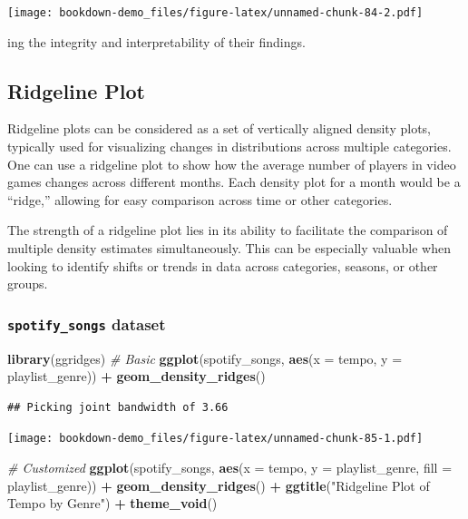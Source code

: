 \documentclass[
  b5paper]{book}
\newenvironment{Shaded}{\begin{snugshade}}{\end{snugshade}}
\newcommand{\AttributeTok}[1]{\textcolor[rgb]{0.13,0.29,0.53}{#1}}
\newcommand{\CommentTok}[1]{\textcolor[rgb]{0.56,0.35,0.01}{\textit{#1}}}
\newcommand{\FunctionTok}[1]{\textcolor[rgb]{0.13,0.29,0.53}{\textbf{#1}}}
\newcommand{\NormalTok}[1]{#1}
\newcommand{\SpecialCharTok}[1]{\textcolor[rgb]{0.81,0.36,0.00}{\textbf{#1}}}
\newcommand{\StringTok}[1]{\textcolor[rgb]{0.31,0.60,0.02}{#1}}
\begin{document}
\texttt{[image: bookdown-demo\_files/figure-latex/unnamed-chunk-84-2.pdf]}

ing the integrity and interpretability of their findings.

\hypertarget{ridgeline-plot}{%
\subsection*{Ridgeline Plot}\label{ridgeline-plot}}

Ridgeline plots can be considered as a set of vertically aligned density plots, typically used for visualizing changes in distributions across multiple categories. One can use a ridgeline plot to show how the average number of players in video games changes across different months. Each density plot for a month would be a ``ridge,'' allowing for easy comparison across time or other categories.

The strength of a ridgeline plot lies in its ability to facilitate the comparison of multiple density estimates simultaneously. This can be especially valuable when looking to identify shifts or trends in data across categories, seasons, or other groups.

\hypertarget{spotify_songs-dataset-7}{%
\subsubsection*{\texorpdfstring{\texttt{spotify\_songs} dataset}{spotify\_songs dataset}}\label{spotify_songs-dataset-7}}

\begin{Shaded}
\begin{Highlighting}[]
\FunctionTok{library}\NormalTok{(ggridges)}
\CommentTok{\# Basic}
\FunctionTok{ggplot}\NormalTok{(spotify\_songs, }\FunctionTok{aes}\NormalTok{(}\AttributeTok{x =}\NormalTok{ tempo, }\AttributeTok{y =}\NormalTok{ playlist\_genre)) }\SpecialCharTok{+} 
  \FunctionTok{geom\_density\_ridges}\NormalTok{()}
\end{Highlighting}
\end{Shaded}

\begin{verbatim}
## Picking joint bandwidth of 3.66
\end{verbatim}

\texttt{[image: bookdown-demo\_files/figure-latex/unnamed-chunk-85-1.pdf]}

\begin{Shaded}
\begin{Highlighting}[]
\CommentTok{\# Customized}
\FunctionTok{ggplot}\NormalTok{(spotify\_songs, }\FunctionTok{aes}\NormalTok{(}\AttributeTok{x =}\NormalTok{ tempo, }\AttributeTok{y =}\NormalTok{ playlist\_genre, }\AttributeTok{fill =}\NormalTok{ playlist\_genre)) }\SpecialCharTok{+} 
  \FunctionTok{geom\_density\_ridges}\NormalTok{() }\SpecialCharTok{+}
  \FunctionTok{ggtitle}\NormalTok{(}\StringTok{"Ridgeline Plot of Tempo by Genre"}\NormalTok{) }\SpecialCharTok{+}
  \FunctionTok{theme\_void}\NormalTok{()}
\end{Highlighting}
\end{Shaded}
\end{document}
